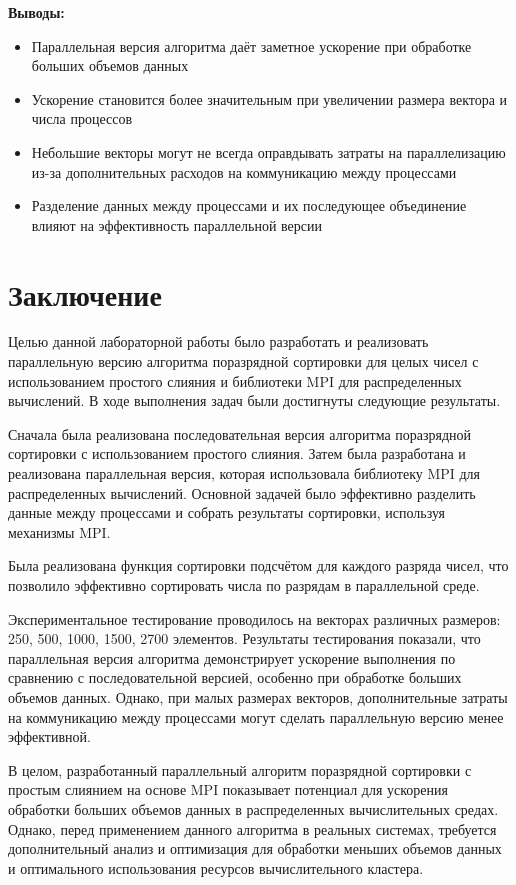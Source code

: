 \documentclass[a4paper, 14pt]{article}
\begin{document}
	\textbf{Выводы:}
	\vspace{-1em}
	\begin{itemize}[leftmargin=3em]
		\setlength\itemsep{0cm}
		\item Параллельная версия алгоритма даёт заметное ускорение при обработке больших объемов данных
		\item Ускорение становится более значительным при увеличении размера вектора и числа процессов
		\item Небольшие векторы могут не всегда оправдывать затраты на параллелизацию из-за дополнительных расходов на коммуникацию между процессами
		\item Разделение данных между процессами и их последующее объединение влияют на эффективность параллельной версии
	\end{itemize}
	
	\newpage
	\section*{\centering Заключение}
	
	Целью данной лабораторной работы было разработать и реализовать параллельную версию алгоритма поразрядной сортировки для целых чисел с использованием простого слияния и библиотеки MPI для распределенных вычислений. В ходе выполнения задач были достигнуты следующие результаты.
	
	Сначала была реализована последовательная версия алгоритма поразрядной сортировки с использованием простого слияния. Затем была разработана и реализована параллельная версия, которая использовала библиотеку MPI для распределенных вычислений. Основной задачей было эффективно разделить данные между процессами и собрать результаты сортировки, используя механизмы MPI.
	
	Была реализована функция сортировки подсчётом для каждого разряда чисел, что позволило эффективно сортировать числа по разрядам в параллельной среде.
	
	Экспериментальное тестирование проводилось на векторах различных размеров: 250, 500, 1000, 1500, 2700 элементов. Результаты тестирования показали, что параллельная версия алгоритма демонстрирует ускорение выполнения по сравнению с последовательной версией, особенно при обработке больших объемов данных. Однако, при малых размерах векторов, дополнительные затраты на коммуникацию между процессами могут сделать параллельную версию менее эффективной.
	
	В целом, разработанный параллельный алгоритм поразрядной сортировки с простым слиянием на основе MPI показывает потенциал для ускорения обработки больших объемов данных в распределенных вычислительных средах. Однако, перед применением данного алгоритма в реальных системах, требуется дополнительный анализ и оптимизация для обработки меньших объемов данных и оптимального использования ресурсов вычислительного кластера.
	
\end{document}
